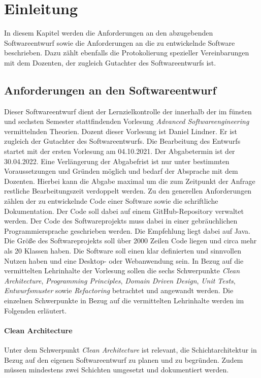 \chapter{Einleitung}
In diesem Kapitel werden die Anforderungen an den abzugebenden Softwareentwurf sowie die Anforderungen an die zu entwickelnde Software beschrieben.
Dazu zählt ebenfalls die Protokolierung spezieller Vereinbarungen mit dem Dozenten, der zugleich Gutachter des Softwareentwurfs ist.

\section{Anforderungen an den Softwareentwurf}
Dieser Softwareentwurf dient der Lernzielkontrolle der innerhalb der im fünsten und sechsten Semester stattfindenden Vorlesung \textit{Advanced Softwareengineering} vermittelnden Theorien.
Dozent dieser Vorlesung ist Daniel Lindner.
Er ist zugleich der Gutachter des Softwareentwurfs.
Die Bearbeitung des Entwurfs startet mit der ersten Vorlesung am 04.10.2021.
Der Abgabetermin ist der 30.04.2022.
Eine Verlängerung der Abgabefrist ist nur unter bestimmten Voraussetzungen und Gründen möglich und bedarf der Absprache mit dem Dozenten.
Hierbei kann die Abgabe maximal um die zum Zeitpunkt der Anfrage restliche Bearbeitungszeit verdoppelt werden.
Zu den generellen Anforderungen zählen der zu entwickelnde Code einer Software sowie die schriftliche Dokumentation.
Der Code soll dabei auf einem GitHub-Repository verwaltet werden.
Der Code des Softwareprojekts muss dabei in einer gebräuchlichen Programmiersprache geschrieben werden.
Die Empfehlung liegt dabei auf Java.
Die Größe des Softwareprojekts soll über 2000 Zeilen Code liegen und circa mehr als 20 Klassen haben.
Die Software soll einen klar definierten und sinnvollen Nutzen haben und eine Desktop- oder Webanwendung sein.
In Bezug auf die vermittelten Lehrinhalte der Vorlesung sollen die sechs Schwerpunkte \textit{Clean Architecture}, \textit{Programming Principles}, \textit{Domain Driven Design}, \textit{Unit Tests}, \textit{Entwurfsmuster} sowie \textit{Refactoring} betrachtet und angewandt werden.
Die einzelnen Schwerpunkte in Bezug auf die vermittelten Lehrinhalte werden im Folgenden erläutert.
\subsubsection*{Clean Architecture}
Unter dem Schwerpunkt \textit{Clean Architecture} ist relevant, die Schichtarchitektur in Bezug auf den eigenen Softwareentwurf zu planen und zu begründen.
Zudem müssen mindestens zwei Schichten umgesetzt und dokumentiert werden.


